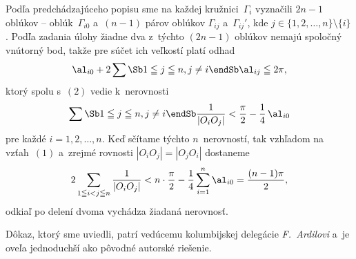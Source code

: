 {Podľa predchádzajúceho popisu sme na každej kružnici~$\Gamma_i$ vyznačili
${2n-1}$ oblúkov -- oblúk~$\Gamma_{i0}$ a~$(n-1)$ párov oblúkov
$\Gamma_{ij}$ a~$\Gamma_{ij}'$, kde
$j\in\{1,2,\dots,n\}\setminus\{i\}$. Podľa zadania úlohy
žiadne dva z~týchto $(2n-1)$ oblúkov nemajú spoločný vnútorný bod,
takže pre súčet ich veľkostí platí odhad
$$
\al_{i0}+2
\sum\limits\Sb 1\leqq j\leqq n,\\j\ne i\endSb
\al_{ij}\leqq 2\pi,
$$
ktorý spolu s~$(2)$ vedie k~nerovnosti
$$
\sum\limits\Sb 1\leqq j\leqq n, \\ \vspace{1pt}  j\ne i\endSb
\frac{1}{|O_iO_j|}<\frac{\pi}{2}-\frac14 \,\al_{i0}
$$
pre každé $i=1,2,\dots,n$.
Keď sčítame týchto $n$~nerovností, tak vzhľadom na vzťah~$(1)$
a~zrejmé rovnosti $|O_iO_j|=|O_jO_i|$ dostaneme
$$
2\sum_{1\leqq i<j\leqq n}\frac{1}{|O_iO_j|}<
n\cdot\frac{\pi}{2}-
\frac14\sum_{i=1}^{n}\al_{i0}=\frac{(n-1)\pi}{2},
$$
odkiaľ po delení dvoma vychádza žiadaná nerovnosť.

\poznamka
Dôkaz, ktorý sme uviedli, patrí vedúcemu kolumbijskej delegácie
{\it F.~Ardilovi\/} a~je oveľa jednoduchší ako pôvodné autorské
riešenie.}

